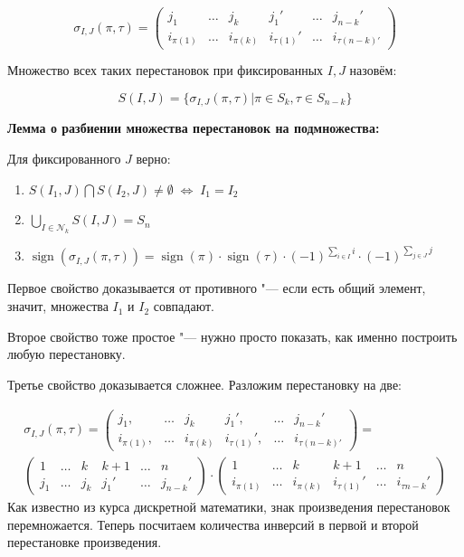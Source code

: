 \documentclass{article}
\begin{document}
\begin{equation*}
	\sigma_{I, J}(\pi, \tau) = 
	\begin{pmatrix}
	j_1 & \ldots & j_k & j_1' & \ldots & j_{n-k}'\\
	i_{\pi(1)} & \ldots & i_{\pi(k)} & i_{\tau(1)}' & \ldots & i_{\tau(n - k)'}
	\end{pmatrix}
\end{equation*}

Множество всех таких перестановок при фиксированных $I, J$ назовём:

$$S(I, J) = \{\sigma_{I, J}(\pi, \tau) | \pi \in S_k, \tau \in S_{n - k}\}$$

\textbf{Лемма о разбиении множества перестановок на подмножества:}

Для фиксированного $J$ верно:
\begin{enumerate}
	\item $S(I_1, J) \bigcap S(I_2, J) \neq \emptyset \;\Leftrightarrow\; I_1 = I_2$
	\item $\bigcup\limits_{I \in \mathcal{N}_k} S(I, J) = S_n$
	\item $\operatorname{sign}(\sigma_{I, J}(\pi, \tau)) = \operatorname{sign}(\pi) \cdot \operatorname{sign}(\tau) \cdot (-1)^{\sum_{i \in I} i} \cdot (-1)^{\sum_{j \in J}j}$
\end{enumerate}

Первое свойство доказывается от противного "--- если есть общий элемент, значит, множества $I_1$ и $I_2$ совпадают. 

Второе свойство тоже простое "--- нужно просто показать, как именно построить любую перестановку.

Третье свойство доказывается сложнее. Разложим перестановку на две:
 
\begin{gather*}
	\sigma_{I, J}(\pi, \tau) = 
	\begin{pmatrix}
	j_1,& \ldots& j_k& j_1', &\ldots& j_{n-k}'\\
	i_{\pi(1)},& \ldots& i_{\pi(k)}&i_{\tau(1)}', &\ldots &i_{\tau(n - k)'}
	\end{pmatrix} = \\
	\begin{pmatrix}
	1 & \ldots & k & k + 1 & \ldots & n \\
	j_1 & \ldots & j_k & j_1' & \ldots & j_{n - k}'
	\end{pmatrix}
	\cdot 
	\begin{pmatrix}
	1 & \ldots & k & k + 1 & \ldots & n \\
	i_{\pi(1)} & \ldots & i_{\pi(k)} & i_{\tau(1)}' & \ldots & i_{\tau{n - k}}'
	\end{pmatrix}
\end{gather*}
Как известно из курса дискретной математики, знак произведения перестановок перемножается. Теперь посчитаем количества инверсий в первой и второй перестановке произведения.
\end{document}
